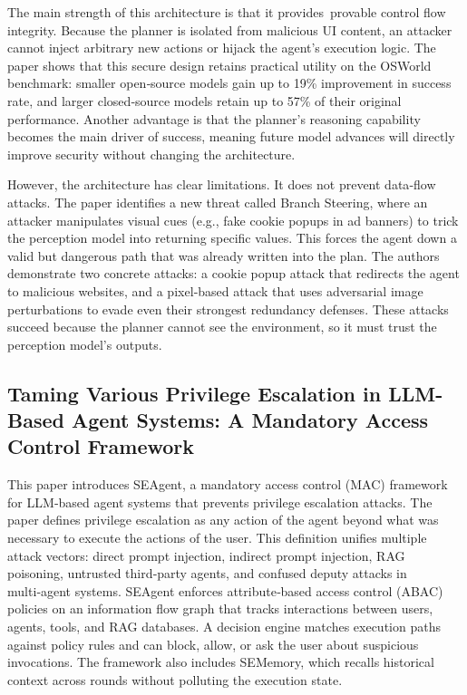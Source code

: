 \documentclass[a4paper]{report}
\begin{document}
The main strength of this architecture is that it provides provable control flow integrity. Because the planner is isolated from malicious UI content, an attacker cannot inject arbitrary new actions or hijack the agent's execution logic. The paper shows that this secure design retains practical utility on the OSWorld benchmark: smaller open‑source models gain up to 19\% improvement in success rate, and larger closed‑source models retain up to 57\% of their original performance. Another advantage is that the planner's reasoning capability becomes the main driver of success, meaning future model advances will directly improve security without changing the architecture.

However, the architecture has clear limitations. It does not prevent data‑flow attacks. The paper identifies a new threat called Branch Steering, where an attacker manipulates visual cues (e.g., fake cookie popups in ad banners) to trick the perception model into returning specific values. This forces the agent down a valid but dangerous path that was already written into the plan. The authors demonstrate two concrete attacks: a cookie popup attack that redirects the agent to malicious websites, and a pixel‑based attack that uses adversarial image perturbations to evade even their strongest redundancy defenses. These attacks succeed because the planner cannot see the environment, so it must trust the perception model's outputs.

\subsection{Taming Various Privilege Escalation in LLM-Based Agent Systems: A Mandatory Access Control Framework}

This paper \cite{ji2025taming} introduces SEAgent, a mandatory access control (MAC) framework for LLM‑based agent systems that prevents privilege escalation attacks. The paper defines privilege escalation as any action of the agent beyond what was necessary to execute the actions of the user. This definition unifies multiple attack vectors: direct prompt injection, indirect prompt injection, RAG poisoning, untrusted third‑party agents, and confused deputy attacks in multi‑agent systems. SEAgent enforces attribute‑based access control (ABAC) policies on an information flow graph that tracks interactions between users, agents, tools, and RAG databases. A decision engine matches execution paths against policy rules and can block, allow, or ask the user about suspicious invocations. The framework also includes SEMemory, which recalls historical context across rounds without polluting the execution state.
\end{document}
